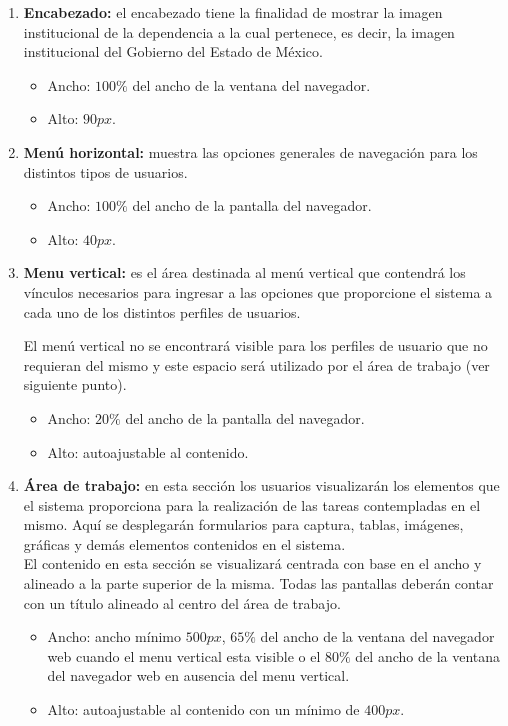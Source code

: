     \begin{enumerate}
        \item {\bf Encabezado:} el encabezado tiene la finalidad de mostrar la imagen institucional de la dependencia a la cual pertenece, es decir, la imagen institucional del Gobierno del Estado de México.
        \begin{itemize}
            \item Ancho: $100\%$ del ancho de la ventana del navegador.
            \item Alto: $90px$.
        \end{itemize}

        \item {\bf Menú horizontal:} muestra las opciones generales de navegación para los distintos tipos de usuarios.
        \begin{itemize}
            \item Ancho: $100\%$ del ancho de la pantalla del navegador.
            \item Alto: $40px$.
        \end{itemize}
        
        \item {\bf Menu vertical:} es el área destinada al menú vertical que contendrá los vínculos necesarios para ingresar a las opciones que proporcione el sistema a cada uno de los distintos perfiles de usuarios.
        
        El menú vertical no se encontrará visible para los perfiles de usuario que no requieran del mismo y este espacio será utilizado por el área de trabajo (ver siguiente punto).
        
        \begin{itemize}
            \item Ancho: $20\%$ del ancho de la pantalla del navegador.
            \item Alto: autoajustable al contenido.
        \end{itemize}
        
        \item {\bf Área de trabajo:} en esta sección los usuarios visualizarán los elementos que el sistema proporciona para la realización de las tareas contempladas en el mismo. Aquí se desplegarán formularios para captura, tablas, imágenes, gráficas y demás elementos contenidos en el sistema.\\
        
        El contenido en esta sección se visualizará centrada con base en el ancho y alineado a la parte superior de la misma. Todas las pantallas deberán contar con un título alineado al centro del área de trabajo. 
        \begin{itemize}
            \item Ancho: ancho mínimo $500px$, $65\%$ del ancho de la ventana del navegador web cuando el menu vertical esta visible o el $80\%$ del ancho de la ventana del navegador web en ausencia del menu vertical.
            \item Alto: autoajustable al contenido con un mínimo de $400px$.
        \end{itemize}
        

\end{enumerate}
